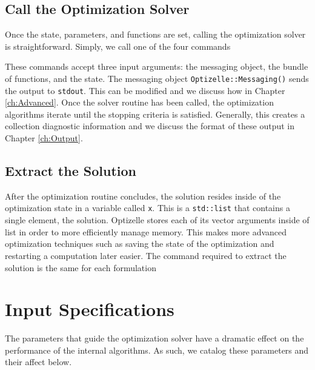 \documentclass{report}
\begin{document}
\section{Call the Optimization Solver}

       Once the state, parameters, and functions are set, calling the optimization solver is straightforward.  Simply, we call one of the four commands

These commands accept three input arguments: the messaging object, the bundle of functions, and the state.  The messaging object \texttt{Optizelle::Messaging()} sends the output to \texttt{stdout}.  This can be modified and we discuss how in Chapter \ref{ch:Advanced}.  Once the solver routine has been called, the optimization algorithms iterate until the stopping criteria is satisfied.  Generally, this creates a collection diagnostic information and we discuss the format of these output in Chapter \ref{ch:Output}.

\section{Extract the Solution}

        After the optimization routine concludes, the solution resides inside of the optimization state in a variable called \texttt{x}.  This is a \texttt{std::list} that contains a single element, the solution.  Optizelle stores each of its vector arguments inside of list in order to more efficiently manage memory.  This makes more advanced optimization techniques such as saving the state of the optimization and restarting a computation later easier.  The command required to extract the solution is the same for each formulation


\chapter{Input Specifications}\label{ch:Input}

        The parameters that guide the optimization solver have a dramatic effect on the performance of the internal algorithms.  As such, we catalog these parameters and their affect below. 
\end{document}
